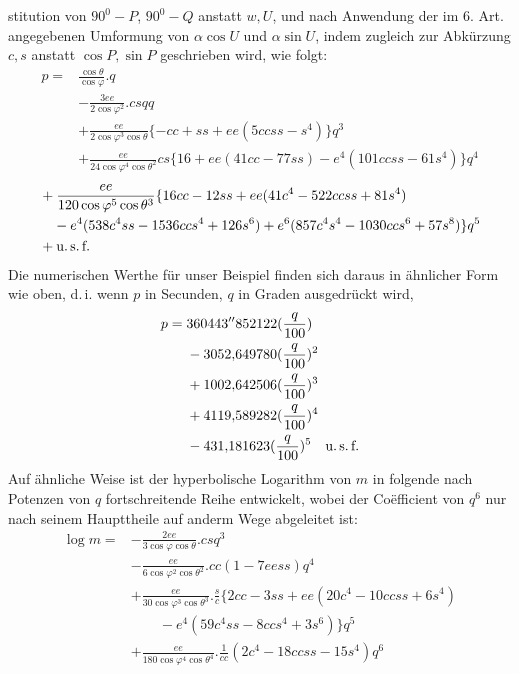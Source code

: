 %
stitution von \(90^0-P\), \(90^0-Q\) anstatt \(w,U\), und nach Anwendung der im 6. Art. angegebenen Umformung von \(\alpha\cos U\) und \(\alpha\sin U\), indem zugleich zur Abkürzung \(c,s\) anstatt \(\cos P,\sin P\) geschrieben wird, wie folgt:
\[
\begin{aligned}
p={}&\frac{\cos\theta}{\cos\varphi}\mathord{.}q\\
&-\frac{3ee}{2\cos\varphi^2}\mathord{.}csqq\\
&+\frac{ee}{2\cos\varphi^3\cos\theta}\{-cc+ss+ee(5ccss-s^4)\}q^3\\
&+\frac{ee}{24\cos\varphi^4\cos\theta^2}cs\{16+ee(41cc-77ss)-e^4(101ccss-61s^4)\}q^4
\end{aligned}
\]
\[
\begin{aligned}
&+\frac{ee}{120\cos\varphi^5\cos\theta^3}\{16cc-12ss+ee(41c^4-522ccss+81s^4)\\
&\quad-e^4(538c^4ss-1536ccs^4+126s^6)+e^6(857c^4s^4-1030ccs^6+57s^8)\}q^5\\
&+\text{u.\,s.\,f.}
\end{aligned}
\]
\indent Die numerischen Werthe für unser Beispiel finden sich daraus in ähnlicher Form wie oben, d.\,i. wenn \(p\) in Secunden, \(q\) in Graden ausgedrückt wird,
\[
\begin{aligned}
p={}&360443''852122(\frac{q}{100})\\
&-3052{,}649780(\frac{q}{100})^2\\
&+1002{,}642506(\frac{q}{100})^3\\
&+4119{,}589282(\frac{q}{100})^4\\
&-431{,}181623(\frac{q}{100})^5\quad\text{u.\,s.\,f.}
\end{aligned}
\]
\indent Auf ähnliche Weise ist der hyperbolische Logarithm von \(m\) in folgende nach Potenzen von \(q\) fortschreitende Reihe entwickelt, wobei der Coëfficient von \(q^6\) nur nach seinem Haupttheile auf anderm Wege abgeleitet ist:
\[
\begin{aligned}
\log m={}&-\frac{2ee}{3\cos\varphi\cos\theta}\mathord{.}csq^3\\
&-\frac{ee}{6\cos\varphi^2\cos\theta^2}\mathord{.}cc(1-7eess)q^4\\
&+\frac{ee}{30\cos\varphi^3\cos\theta^3}\mathord{.}\frac{s}{c}\{2cc-3ss+ee(20c^4-10ccss+6s^4)\\
&\qquad-e^4(59c^4ss-8ccs^4+3s^6)\}q^5\\
&+\frac{ee}{180\cos\varphi^4\cos\theta^4}\mathord{.}\frac{1}{cc}(2c^4-18ccss-15s^4)q^6
\end{aligned}
\]
